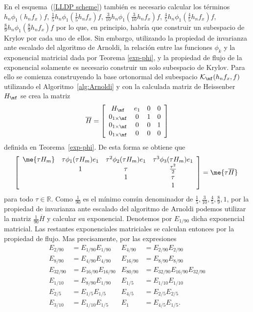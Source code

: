 En el esquema~(\ref{LLDP scheme}) tambi\'en es necesario calcular los términos
$h_n\phi_1(h_n f_x)f$, $\frac{1}{5}h_n\phi_1(\frac{1}{5}h_nf_x)f$, $\frac{3}{10}h_n\phi_1(\frac{3}{10}h_n f_x)f$, 
$\frac{4}{5}h_n\phi_1(\frac{4}{5} h_nf_x)f$, $\frac{8}{9}h_n\phi_1(\frac{8}{9}h_n f_x)f$
por lo que, en principio, habr\'ia que construir un subespacio de Krylov por cada uno de ellos. Sin embargo, utilizando la propiedad de invarianza 
ante escalado del algoritmo de Arnoldi, la relaci\'on entre las funciones $\phi_k$ y la exponencial matricial dada por Teorema \ref{exp-phi}, y la propiedad de flujo de la exponencial solamente es necesario construir un solo subespacio de Krylov. Para ello se comienza construyendo la base ortonormal del subespacio $\mathcal{K}_\mf(h_nf_x,f)$ utilizando el Algoritmo~\ref{alg:Arnoldi} y con la calculada matriz de Heissenber $H_\mf$ se crea la matriz 
\begin{equation}
    \overline{H} = \left[\begin{array}{cccc}
        H_\mf & e_1 & 0 & 0\\
        0_{1\times\mf} & 0 & 1 & 0\\
        0_{1\times\mf} & 0 & 0 & 1\\
        0_{1\times\mf} & 0 & 0 & 0
    \end{array}\right] \label{hhat}
\end{equation} definida en Teorema~\ref{exp-phi}. De esta forma se obtiene que 
\begin{equation}
\left[\begin{array}{cccc}
\me{\tau H_m} & \tau\phi_1(\tau H_m)e_1 & \tau^{2}\phi_2(\tau H_m)e_1 &
\tau^{3}\phi_3(\tau H_m)e_1 \\
& 1 & \tau & \frac{\tau^{2}}{2}\\
&  & 1 & \tau \\
&   &   & 1 \\
\end{array}\right] = \me{\tau\overline{H}} \; \label{phi_hhat}
\end{equation}
para todo $\tau \in \mathbb{R}$. Como $\frac{1}{90}$ es el m\'inimo com\'un denominador de $\frac{1}{5},\frac{3}{10},\frac{4}{5},\frac{8}{9},1$, por la propiedad de invarianza 
ante escalado del algoritmo de Arnoldi podemos utilizar la matriz $\frac{1}{90}\overline{H}$ y calcular su exponencial. Denotemos por $E_{1/90}$ dicha exponencial matricial. Las restantes exponenciales matriciales se calculan entonces por la propiedad de flujo. Mas precisamente, por las expresiones
\begin{align*}
    E_{2/90} &= E_{1/90}E_{1/90} & E_{4/90} &= E_{2/90}E_{2/90}\\
    E_{8/90} &= E_{4/90}E_{4/90} & E_{16/90} &= E_{8/90}E_{8/90}\\
    E_{32/90} &= E_{16/90}E_{16/90} & E_{80/90} &= E_{32/90}E_{16/90}E_{32/90}\\
    E_{1/10} &= E_{8/90}E_{1/90} & E_{1/5} &= E_{1/10}E_{1/10}\\
    E_{2/5} &= E_{1/5}E_{1/5} & E_{4/5} &= E_{2/5}E_{2/5}\\
    E_{3/10} &= E_{1/10}E_{1/5} & E_1 &= E_{4/5}E_{1/5}.
\end{align*}

